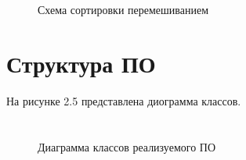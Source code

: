 \documentclass[12pt,a4paper]{report}
\begin{document}
\begin{figure}[pt!]
	\caption{Схема сортировки перемешиванием}
	\label{fig:image}
\end{figure}

\section{Структура ПО}

На рисунке 2.5 представлена диограмма классов.

\section*{}
\begin{figure}[ht]
	\caption{Диаграмма классов реализуемого ПО}
\end{figure}
\end{document}

